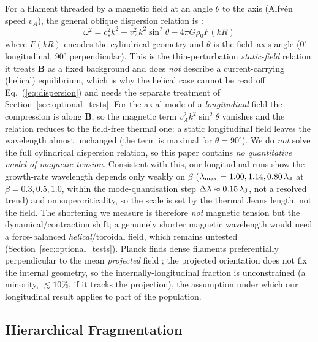 \documentclass[usenatbib,twoside,twocolumn]{mnras}
\begin{document}
For a filament threaded by a magnetic field at an angle $\theta$ to the axis (Alfv\'en speed $v_A$), the general oblique dispersion relation is \citep{Nakamura1993}:
\begin{equation}
\omega^2 = c_s^2 k^2 + v_A^2 k^2 \sin^2\theta - 4\pi G\rho_0 F(kR)
\label{eq:dispersion}
\end{equation}
where $F(kR)$ encodes the cylindrical geometry and $\theta$ is the field--axis angle ($0^\circ$ longitudinal, $90^\circ$ perpendicular). This is the thin-perturbation \emph{static-field} relation: it treats $\mathbf{B}$ as a fixed background and does \emph{not} describe a current-carrying (helical) equilibrium, which is why the helical case cannot be read off Eq.~(\ref{eq:dispersion}) and needs the separate treatment of Section~\ref{sec:optional_tests}. For the axial mode of a \emph{longitudinal} field the compression is along $\mathbf{B}$, so the magnetic term $v_A^2k^2\sin^2\theta$ vanishes and the relation reduces to the field-free thermal one: a static longitudinal field leaves the wavelength almost unchanged (the term is maximal for $\theta=90^\circ$). We do \emph{not} solve the full cylindrical dispersion relation, so this paper contains \emph{no quantitative model of magnetic tension}. Consistent with this, our longitudinal runs show the growth-rate wavelength depends only weakly on $\beta$ ($\lambda_{\rm max}=1.00,1.14,0.80\,\lambda_{\rm J}$ at $\beta=0.3,0.5,1.0$, within the mode-quantisation step $\Delta\lambda\approx0.15\,\lambda_{\rm J}$, not a resolved trend) and on supercriticality, so the scale is set by the thermal Jeans length, not the field. The shortening we measure is therefore \emph{not} magnetic tension but the dynamical/contraction shift; a genuinely shorter magnetic wavelength would need a force-balanced \emph{helical}/toroidal field, which remains untested (Section~\ref{sec:optional_tests}). Planck finds dense filaments preferentially perpendicular to the mean \emph{projected} field \citep{Jadhav2026}; the projected orientation does not fix the internal geometry, so the internally-longitudinal fraction is unconstrained (a minority, $\lesssim10\%$, if it tracks the projection), the assumption under which our longitudinal result applies to part of the population.

\subsection{Hierarchical Fragmentation}
\end{document}
